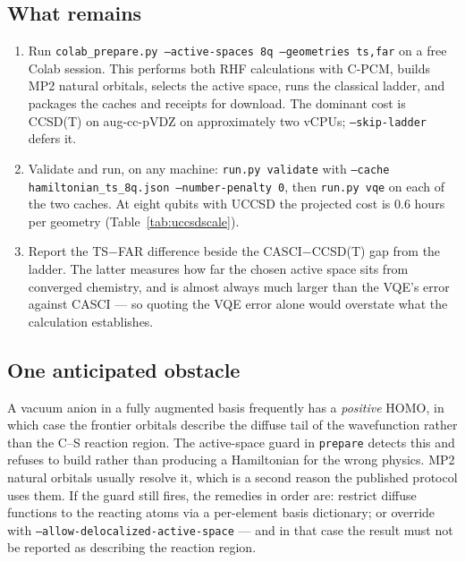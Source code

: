 \documentclass[11pt,a4paper]{article}
\newcommand{\code}[1]{\texttt{\small #1}}
\begin{document}
\subsection{What remains}

\begin{enumerate}[leftmargin=1.4em,itemsep=0.2em]

\item Run \code{colab\_prepare.py --active-spaces 8q --geometries ts,far} on a
  free Colab session. This performs both RHF calculations with C-PCM, builds
  MP2 natural orbitals, selects the active space, runs the classical ladder, and
  packages the caches and receipts for download. The dominant cost is CCSD(T) on
  aug-cc-pVDZ on approximately two vCPUs; \code{--skip-ladder} defers it.

\item Validate and run, on any machine: \code{run.py validate} with
  \code{--cache hamiltonian\_ts\_8q.json --number-penalty 0}, then
  \code{run.py vqe} on each of the two caches. At eight qubits with UCCSD the
  projected cost is $0.6$ hours per geometry (Table~\ref{tab:uccsdscale}).

\item Report the TS$-$FAR difference beside the CASCI$-$CCSD(T) gap from the
  ladder. The latter measures how far the chosen active space sits from
  converged chemistry, and is almost always much larger than the VQE's error
  against CASCI --- so quoting the VQE error alone would overstate what the
  calculation establishes.

\end{enumerate}

\subsection{One anticipated obstacle}

A vacuum anion in a fully augmented basis frequently has a \emph{positive} HOMO,
in which case the frontier orbitals describe the diffuse tail of the wavefunction
rather than the C--S reaction region. The active-space guard in \code{prepare}
detects this and refuses to build rather than producing a Hamiltonian for the
wrong physics. MP2 natural orbitals usually resolve it, which is a second reason
the published protocol uses them. If the guard still fires, the remedies in
order are: restrict diffuse functions to the reacting atoms via a per-element
basis dictionary; or override with
\code{--allow-delocalized-active-space} --- and in that case the result must not
be reported as describing the reaction region.
\end{document}
